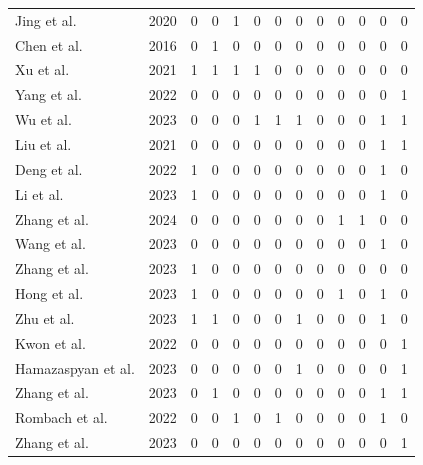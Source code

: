 \documentclass[preprint,12pt]{elsarticle}
\begin{document}
\begin{table}[t]
{\begin{tabular}{lcccccccccccc}
                Jing et al.\citep{41jing2020dynamic} & 2020 & 0 & 0 & 1 & 0 & 0 & 0 & 0 & 0 & 0 & 0 & 0 \\
                Chen et al.\citep{43chen2016fast} & 2016 & 0 & 1 & 0 & 0 & 0 & 0 & 0 & 0 & 0 & 0 & 0 \\
                Xu et al.\citep{44xu2021drb} & 2021 & 1 & 1 & 1 & 1 & 0 & 0 & 0 & 0 & 0 & 0 & 0 \\
                Yang et al.\citep{45yang2022pastiche} & 2022 & 0 & 0 & 0 & 0 & 0 & 0 & 0 & 0 & 0 & 0 & 1 \\
                Wu et al.\citep{47wu2023preserving} & 2023 & 0 & 0 & 0 & 1 & 1 & 1 & 0 & 0 & 0 & 1 & 1 \\
                Liu et al.\citep{48liu2021adaattn} & 2021 & 0 & 0 & 0 & 0 & 0 & 0 & 0 & 0 & 0 & 1 & 1 \\
                Deng et al.\citep{49deng2022stytr2} & 2022 & 1 & 0 & 0 & 0 & 0 & 0 & 0 & 0 & 0 & 1 & 0 \\
                Li et al.\citep{50li2023compact} & 2023 & 1 & 0 & 0 & 0 & 0 & 0 & 0 & 0 & 0 & 1 & 0 \\
                Zhang et al.\citep{51zhang2024rethink} & 2024 & 0 & 0 & 0 & 0 & 0 & 0 & 0 & 1 & 1 & 0 & 0 \\
                Wang et al.\citep{52wang2023interactive} & 2023 & 0 & 0 & 0 & 0 & 0 & 0 & 0 & 0 & 0 & 1 & 0 \\
                Zhang et al.\citep{53zhang2023edge} & 2023 & 1 & 0 & 0 & 0 & 0 & 0 & 0 & 0 & 0 & 0 & 0 \\
                Hong et al.\citep{54hong2023aespa} & 2023 & 1 & 0 & 0 & 0 & 0 & 0 & 0 & 1 & 0 & 1 & 0 \\
                Zhu et al.\citep{55zhu2023all} & 2023 & 1 & 1 & 0 & 0 & 0 & 1 & 0 & 0 & 0 & 1 & 0 \\
                Kwon et al.\citep{57kwon2022clipstyler} & 2022 & 0 & 0 & 0 & 0 & 0 & 0 & 0 & 0 & 0 & 0 & 1 \\
                Hamazaspyan et al.\citep{59hamazaspyan2023diffusion} & 2023 & 0 & 0 & 0 & 0 & 0 & 1 & 0 & 0 & 0 & 0 & 1 \\
                Zhang et al.\citep{60zhang2024artbank} & 2023 & 0 & 1 & 0 & 0 & 0 & 0 & 0 & 0 & 0 & 1 & 1 \\
                Rombach et al.\citep{61rombach2022high} & 2022 & 0 & 0 & 1 & 0 & 1 & 0 & 0 & 0 & 0 & 1 & 0 \\
                Zhang et al.\citep{62zhang2023inversion} & 2023 & 0 & 0 & 0 & 0 & 0 & 0 & 0 & 0 & 0 & 0 & 1 \\

\end{tabular}}
\end{table}
\end{document}
